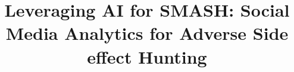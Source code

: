 \documentclass[referee,bst/sn-basic]{sn-jnl}%
\theoremstyle{thmstyletwo}%
\theoremstyle{thmstylethree}%
\begin{document}
\title[Article Title]{Leveraging AI for SMASH: Social Media Analytics for Adverse Side effect Hunting
}


% 


\begin{comment}
    
\author*[1]{\fnm{Alon} \sur{Bartal}}\email{bartal.alon@biu.ac.il}

\author[2]{\fnm{Nava} \sur{Pliskin}}\email{pliskinn@bgu.ac.il}

\author[1]{\fnm{Kathleen M.} \sur{Jagodnik}}\email{kathleen.jagodnik@biu.ac.il}

\author[3]{\fnm{Lena} \sur{Novack}}\email{novack@bgu.ac.il}

\author[4]{\fnm{Abraham} \sur{Seidmann}}\email{avis@bu.edu}

\affil*[1]{\orgdiv{The School of Business Administration}, \orgname{Bar-Ilan University}, \orgaddress{\street{Max and Anna Web}, \city{Ramat Gan}, \postcode{5290002}, \state{Israel}}}

\affil[2]{\orgdiv{Department of Industrial Engineering \& Management}, \orgname{Ben-Gurion University of the Negev}, \orgaddress{\street{David Ben Gurion Blvd.}, \city{Beer-Sheva}, \postcode{84105}, \state{Israel}}}

\affil[3]{\orgdiv{Questrom School of Business}, \orgname{Boston University}, \orgaddress{\street{Commonwealth Avenue}, \city{Boston}, \postcode{02215}, \state{MA}, \country{USA}}}

\affil[4]{\orgdiv{Soroka University Medical Center}, \orgname{Ben-Gurion University of the Negev}, \orgaddress{\street{David Ben Gurion Blvd.}, \city{Beer-Sheva}, \postcode{84105}, \state{Israel}, \country{USA}}}

\end{comment}
\end{document}
